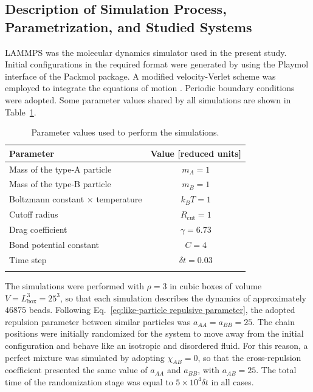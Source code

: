 \documentclass[
journal=mamobx,
manuscript=article,
]{achemso}
\begin{document}
\subsection{Description of Simulation Process, Parametrization, and Studied Systems}




LAMMPS \cite{Plimpton_1995a} was the molecular dynamics simulator used in the present study.
Initial configurations in the required format were generated by using the Playmol\cite{Abreu_2019} interface of the Packmol\cite{Martinez_2009} package.
A modified velocity-Verlet scheme was employed to integrate the equations of motion \cite{Frenkel_2002, Allen_1989, Lemos_2020}.
Periodic boundary conditions were adopted.
Some parameter values shared by all simulations are shown in Table~\ref{table:parameters}.

\begin{table}
	\centering
	\caption{Parameter values used to perform the simulations.}
	\begin{tabular*}{\textwidth}{@{\extracolsep{\fill}}lc}
		\hline\hline
		Parameter & Value [reduced units] \\
		\hline
		Mass of the type-A particle & $m_A = 1$ \\
		Mass of the type-B particle & $m_B = 1$ \\
		Boltzmann constant $\times$ temperature & $k_B T = 1$ \\
		Cutoff radius & $R_\mathrm{cut} = 1$ \\
		Drag coefficient & $\gamma = 6.73$ \\
		Bond potential constant & $C = 4$ \\
		Time step & $\delta t = 0.03$ \\
		\hline\hline
		\label{table:parameters} 
	\end{tabular*}
\end{table}

The simulations were performed with $\rho = 3$ in cubic boxes of volume $V = L_\mathrm{box}^3 = 25^3$, so that each simulation describes the dynamics of approximately $46875$ beads.
Following Eq.~\eqref{eq:like-particle repulsive parameter}, the adopted repulsion parameter between similar particles was $a_{AA} = a_{BB} = 25$.
The chain positions were initially randomized for the system to move away from the initial configuration and behave like an isotropic and disordered fluid.
For this reason, a perfect mixture was simulated by adopting $\chi_{AB} = 0$, so that the cross-repulsion coefficient presented the same value of $a_{AA}$ and $a_{BB}$, with $a_{AB} = 25$.
The total time of the randomization stage was equal to $5\times 10^4 \delta t$ in all cases.
\end{document}
